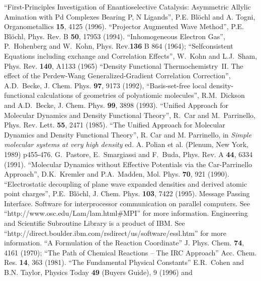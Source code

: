 \documentclass[final,12pt]{article}
\begin{document}
\newpage
\begin{thebibliography}{99}
 ``First-Principles Investigation of Enantioselective
  Catalysis: Asymmetric Allylic Amination with Pd Complexes Bearing P,
  N Ligands'', P.E. Bl\"ochl and A. Togni, Organometallics {\bf 15},
  4125 (1996).
``Projector Augmented Wave Method'', P.E. Bl\"ochl, Phys.
  Rev. B {\bf 50}, 17953 (1994).
 ``Inhomogeneous Electron Gas'', P.~Hohenberg and
  W.~Kohn, Phys. Rev.{\bf 136} B 864 (1964); ``Selfconsistent Equations
  including exchange and Correlation Effects'', W.~Kohn and L.J.~Sham,
  Phys. Rev. {\bf 140}, A1133 (1965)
 ``Density Functional Thermochemistry~II. The
  effect of the Perdew-Wang Generalized-Gradient Correlation
  Correction'', A.D.~Becke, J. Chem. Phys. {\bf 97}, 9173 (1992),
  ``Basis-set-free local density-functional calculations of geometries
  of polyatiomic molecules'', R.M.~Dickson and A.D.~Becke,
  J. Chem. Phys. {\bf 99}, 3898 (1993).
``Unified Approach for Molecular Dynamics and Density
  Functional Theory'', R.~Car and M.~Parrinello, Phys. Rev. Lett. {\bf
    55}, 2471 (1985).
 ``The Unified Approach for Molecular Dynamics and
  Density Functional Theory'', R. Car and M. Parrinello, in {\it
    Simple molecular systems at very high density} ed. A. Polian et
  al. (Plenum, New York, 1989) p455-476.
G.~Pastore, E.~Smargiassi and F.~Buda, Phys. Rev. A
  {\bf 44}, 6334 (1991).
 ``Molecular Dynamics without Effective Potentials via
  the Car-Parrinello Approach'', D.K.~Kremler and P.A.~Madden, Mol.
  Phys. {\bf 70}, 921 (1990).
``Electrostatic decoupling of plane wave expanded
  densities and derived atomic point charges'', P.E.~Bl\"ochl, J.
  Chem. Phys. {\bf 103}, 7422 (1995).
 Message Passing Interface. Software for interprocessor
  communication on parallel computers. See
  ``http://www.osc.edu/Lam/lam.html\#MPI'' for more information.
 Engineering and Scientific Subroutine Library is a
  product of IBM. See
  ``http://direct.boulder.ibm.com/rsdirect/us/software/essl.htm'' for
  more information.
 ``A Formulation of the Reaction Coordinate'' J. Phys.
  Chem. {\bf 74}, 4161 (1970); ``The Path of Chemical Reactions -- The
  IRC Approach'' Acc. Chem. Res. {\bf 14}, 363 (1981).
``The Fundamental Physical Constants'' E.R.~Cohen
  and B.N. Taylor, Physics Today {\bf 49} (Buyers Guide), 9 (1996) and

\end{thebibliography}
\end{document}
